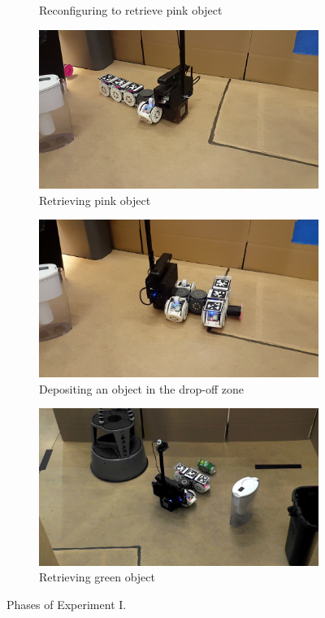 \documentclass[conference]{IEEEtran}
\begin{document}
\begin{figure}[t]
\begin{subfigure}[t]{0.32\textwidth}
        \caption{Reconfiguring to retrieve pink object}
    \end{subfigure}
    \begin{subfigure}[t]{0.32\textwidth}
        \includegraphics[width=\textwidth]{images/pink_retrieval.png}
        \caption{Retrieving pink object}
        \label{fig:pink_grab}
    \end{subfigure}
    \begin{subfigure}[t]{0.32\textwidth}
        \includegraphics[width=\textwidth]{images/dropoff.jpg}
        \caption{Depositing an object in the drop-off zone}
        \label{fig:dropoff}
    \end{subfigure}
    \begin{subfigure}[t]{0.32\textwidth}
        \includegraphics[width=\textwidth]{images/green_retrieval.jpg}
        \caption{Retrieving green object}
    \end{subfigure}
      \caption{Phases of Experiment I.}
      \label{fig:demo}
   \vspace{-1em}
   \end{figure}
\end{document}
